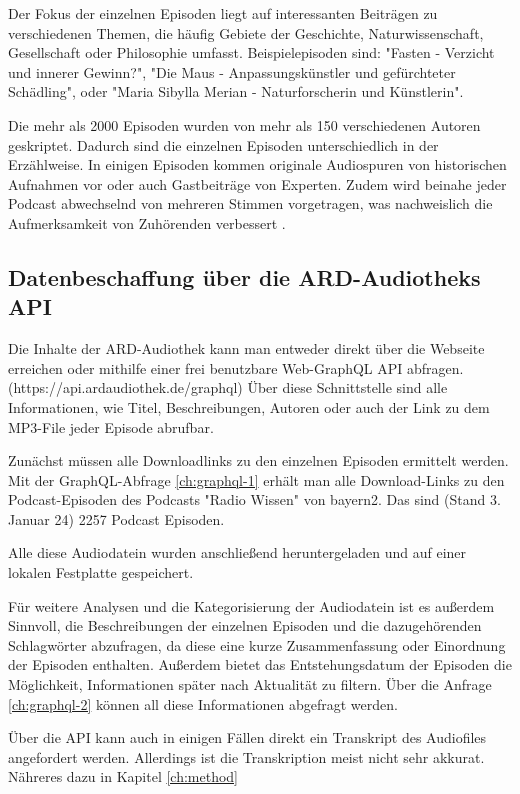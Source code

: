 Der Fokus der einzelnen Episoden liegt auf interessanten Beiträgen zu verschiedenen Themen, die häufig Gebiete der Geschichte, Naturwissenschaft, Gesellschaft oder Philosophie umfasst.
Beispielepisoden sind: "Fasten - Verzicht und innerer Gewinn?", "Die Maus - Anpassungskünstler und gefürchteter Schädling", oder "Maria Sibylla Merian - Naturforscherin und Künstlerin".

Die mehr als 2000 Episoden wurden von mehr als 150 verschiedenen Autoren geskriptet.
Dadurch sind die einzelnen Episoden unterschiedlich in der Erzählweise.
In einigen Episoden kommen originale Audiospuren von historischen Aufnahmen vor oder auch Gastbeiträge von Experten. 
Zudem wird beinahe jeder Podcast abwechselnd von mehreren Stimmen vorgetragen, was nachweislich die Aufmerksamkeit von Zuhörenden verbessert \cite{kang2012}.

\subsection{Datenbeschaffung über die ARD-Audiotheks API}

Die Inhalte der ARD-Audiothek kann man entweder direkt über die Webseite erreichen oder mithilfe einer frei benutzbare Web-GraphQL API abfragen.
(https://api.ardaudiothek.de/graphql) 
Über diese Schnittstelle sind alle Informationen, wie Titel, Beschreibungen, Autoren oder auch der Link zu dem MP3-File jeder Episode abrufbar.

Zunächst müssen alle Downloadlinks zu den einzelnen Episoden ermittelt werden.
Mit der GraphQL-Abfrage \autoref{ch:graphql-1} erhält man alle Download-Links zu den Podcast-Episoden des Podcasts "Radio Wissen" von bayern2.
Das sind (Stand 3. Januar 24) 2257 Podcast Episoden.

Alle diese Audiodatein wurden anschließend heruntergeladen und auf einer lokalen Festplatte gespeichert.

Für weitere Analysen und die Kategorisierung der Audiodatein ist es außerdem Sinnvoll, die Beschreibungen der einzelnen Episoden und die dazugehörenden Schlagwörter abzufragen, da diese eine kurze Zusammenfassung oder Einordnung der Episoden enthalten.
Außerdem bietet das Entstehungsdatum der Episoden die Möglichkeit, Informationen später nach Aktualität zu filtern.
Über die Anfrage \autoref{ch:graphql-2} können all diese Informationen abgefragt werden.

Über die API kann auch in einigen Fällen direkt ein Transkript des Audiofiles angefordert werden. 
Allerdings ist die Transkription meist nicht sehr akkurat.
Nähreres dazu in Kapitel \autoref{ch:method}


